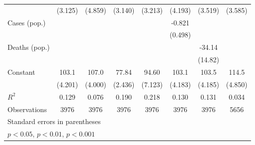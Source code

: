 \documentclass{article}
\begin{document}
{\begin{longtable}{l*{7}{c}}
                &  (3.125)         &  (4.859)         &  (3.140)         &  (3.213)         &  (4.193)         &  (3.519)         &  (3.585)         \\
Cases (pop.)    &                  &                  &                  &                  &   -0.821         &                  &                  \\
                &                  &                  &                  &                  &  (0.498)         &                  &                  \\
Deaths (pop.)   &                  &                  &                  &                  &                  &   -34.14\sym{*}  &                  \\
                &                  &                  &                  &                  &                  &  (14.82)         &                  \\
Constant        &    103.1\sym{***}&    107.0\sym{***}&    77.84\sym{***}&    94.60\sym{***}&    103.1\sym{***}&    103.5\sym{***}&    114.5\sym{***}\\
                &  (4.201)         &  (4.000)         &  (2.436)         &  (7.123)         &  (4.183)         &  (4.185)         &  (4.850)         \\
\hline
\(R^{2}\)       &    0.129         &    0.076         &    0.190         &    0.218         &    0.130         &    0.131         &    0.034         \\
Observations    &     3976         &     3976         &     3976         &     3976         &     3976         &     3976         &     5656         \\
\hline\hline
\multicolumn{8}{l}{\footnotesize Standard errors in parentheses}\\
\multicolumn{8}{l}{\footnotesize \sym{*} \(p<0.05\), \sym{**} \(p<0.01\), \sym{***} \(p<0.001\)}\\
\end{longtable}
}
\end{document}
